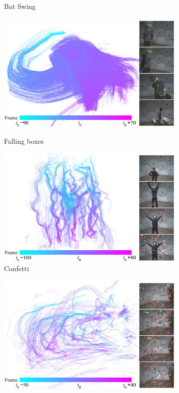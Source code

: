 \begin{figure}[t]
\begin{subfigure}{0.45\textwidth}
			\caption{Bat Swing}
			\label{Fig:baseball}
	\end{subfigure}
	\begin{subfigure}{0.45\textwidth}
		\includegraphics[width=\textwidth]{figures/box_small}\\
			\caption{Falling boxes}
			\label{Fig:box}
	\end{subfigure}
	\begin{subfigure}{0.45\textwidth}
		\includegraphics[width=\textwidth]{figures/confetti_small}
			\caption{Confetti}
			\label{Fig:confetti}
	\end{subfigure}
	\begin{subfigure}{0.45\textwidth}
		\includegraphics[width=\textwidth]{figures/fluid_small}   

\end{subfigure}
\end{figure}
